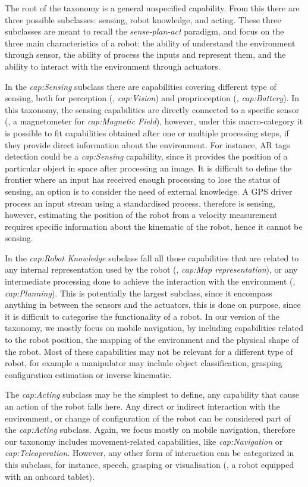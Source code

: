 The root of the taxonomy is a general unspecified capability. From this there are three possible subclasses: sensing, robot knowledge, and acting. These three subclasses are meant to recall the \textit{sense-plan-act} paradigm, and focus on the three main characteristics of a robot: the ability of understand the environment through sensor, the ability of process the inputs and represent them, and the ability to interact with the environment through actuators.

In the \textit{cap:Sensing} subclass there are capabilities covering different type of sensing, both for perception (\eg, \textit{cap:Vision}) and proprioception (\eg, \textit{cap:Battery}). In this taxonomy, the sensing capabilities are directly connected to a specific sensor (\eg, a magnetometer for \textit{cap:Magnetic Field}), however, under this macro-category it is possible to fit capabilities obtained after one or multiple processing steps, if they provide direct information about the environment. For instance, AR tags detection could be a \textit{cap:Sensing} capability, since it provides the position of a particular object in space after processing an image. It is difficult to define the frontier where an input has received enough processing to lose the status of sensing, an option is to consider the need of external knowledge.  A GPS driver process an input stream using a standardised process, therefore is sensing, however, estimating the position of the robot from a velocity measurement requires specific information about the kinematic of the robot, hence it cannot be sensing.

In the \textit{cap:Robot Knowledge} subclass fall all those capabilities that are related to any internal representation used by the robot (\eg, \textit{cap:Map representation}), or any intermediate processing done to achieve the interaction with the environment (\eg, \textit{cap:Planning}). This is potentially the largest subclass, since it encompass anything in between the sensors and the actuators, this is done on purpose, since it is difficult to categorise the functionality of a robot. In our version of the taxonomy, we mostly focus on mobile navigation, by including capabilities related to the robot position, the mapping of the environment and the physical shape of the robot. Most of these capabilities may not be relevant for a different type of robot, for example a manipulator may include object classification, grasping configuration estimation or inverse kinematic.

The \textit{cap:Acting} subclass may be the simplest to define, any capability that cause an action of the robot falls here. Any direct or indirect interaction with the environment, or change of configuration of the robot can be considered part of the \textit{cap:Acting} subclass. Again, we focus mostly on mobile navigation, therefore our taxonomy includes movement-related capabilities, like \textit{cap:Navigation} or \textit{cap:Teleoperation}. However, any other form of interaction can be categorized in this subclass, for instance, speech, grasping or visualisation (\eg, a robot equipped with an onboard tablet).


